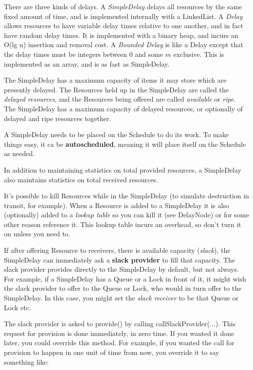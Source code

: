 \documentclass[twoside,10pt]{article}
\begin{document}
There are three kinds of delays.  A {\it SimpleDelay} delays all resources by the same fixed amount of time, and is implemented internally with a LinkedList.  A {\it Delay} allows resources to have variable delay times relative to one another, and in fact have random delay times.  It is implemented with a binary heap, and incurs an O(lg n) insertion and removal cost.  A {\it Bounded Delay} is like a Delay except that the delay times must be integers between 0 and some \(m\) exclusive.  This is implemented as an array, and is as fast as SimpleDelay.

The SimpleDelay has a maximum capacity of items it may store which are presently delayed.  The Resources held up in the SimpleDelay are called the {\it delayed resources}, and the Resources being offered are called {\it available} or {\it ripe}.  The SimpleDelay has a maximum capacity of delayed resources, or optionally of delayed and ripe resources together.

A SimpleDelay needs to be placed on the Schedule to do its work.  To make things easy, it ca be {\bf autoscheduled}, meaning it will place itself on the Schedule as needed.

In addition to maintaining statistics on total provided resources, a SimpleDelay also maintains statistics on total received resources.

It's possible to kill Resources while in the SimpleDelay (to simulate destruction in transit, for example).  When a Resource is added to a SimpleDelay it is also (optionally) added to a {\it lookup table} so you can kill it (see DelayNode) or for some other reason reference it.  This lookup table incurs an overhead, so don't turn it on unless you need to.

If after offering Resource to receivers, there is available capacity ({\it slack}), the SimpleDelay can immediately ask a {\bf slack provider} to fill that capacity.  The slack provider provides directly to the SimpleDelay by default, but not always.  For example, if a SimpleDelay has a Queue or a Lock in front of it, it might wish the slack provider to offer to the Queue or Lock, who would in turn offer to the SimpleDelay.  In this case, you might set the {\it slack receiver} to be that Queue or Lock etc.

The slack provider is asked to provide() by calling callSlackProvider(...).  This request for provision is done immediately, in zero time.  If you wanted it done later, you could override this method.  For example, if you wanted the call for provision to happen in one unit of time from now, you override it to say something like:
\end{document}
